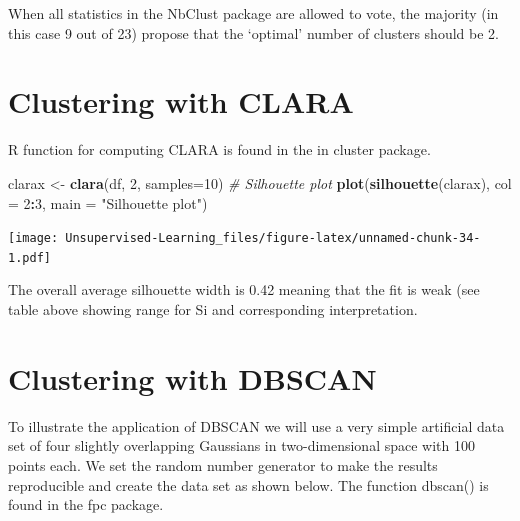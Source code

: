 \documentclass[
]{book}
\newenvironment{Shaded}{\begin{snugshade}}{\end{snugshade}}
\newcommand{\CommentTok}[1]{\textcolor[rgb]{0.56,0.35,0.01}{\textit{#1}}}
\newcommand{\DataTypeTok}[1]{\textcolor[rgb]{0.13,0.29,0.53}{#1}}
\newcommand{\DecValTok}[1]{\textcolor[rgb]{0.00,0.00,0.81}{#1}}
\newcommand{\KeywordTok}[1]{\textcolor[rgb]{0.13,0.29,0.53}{\textbf{#1}}}
\newcommand{\NormalTok}[1]{#1}
\newcommand{\OperatorTok}[1]{\textcolor[rgb]{0.81,0.36,0.00}{\textbf{#1}}}
\newcommand{\StringTok}[1]{\textcolor[rgb]{0.31,0.60,0.02}{#1}}
\begin{document}
When all statistics in the NbClust package are allowed to vote, the majority (in this case 9 out of 23) propose
that the `optimal' number of clusters should be 2.

\hypertarget{clustering-with-clara}{%
\section{Clustering with CLARA}\label{clustering-with-clara}}

R function for computing CLARA is found in the in cluster package.

\begin{Shaded}
\begin{Highlighting}[]
\NormalTok{clarax <-}\StringTok{ }\KeywordTok{clara}\NormalTok{(df, }\DecValTok{2}\NormalTok{, }\DataTypeTok{samples=}\DecValTok{10}\NormalTok{)}
\CommentTok{# Silhouette plot}
\KeywordTok{plot}\NormalTok{(}\KeywordTok{silhouette}\NormalTok{(clarax), }\DataTypeTok{col =} \DecValTok{2}\OperatorTok{:}\DecValTok{3}\NormalTok{, }\DataTypeTok{main =} \StringTok{"Silhouette plot"}\NormalTok{)}
\end{Highlighting}
\end{Shaded}

\texttt{[image: Unsupervised-Learning\_files/figure-latex/unnamed-chunk-34-1.pdf]}

The overall average silhouette width is 0.42 meaning that the fit is weak (see table above showing range for Si and corresponding interpretation.

\hypertarget{clustering-with-dbscan}{%
\section{Clustering with DBSCAN}\label{clustering-with-dbscan}}

To illustrate the application of DBSCAN we will use a very simple artificial data set of four slightly overlapping
Gaussians in two-dimensional space with 100 points each. We set the random number generator to make
the results reproducible and create the data set as shown below. The function dbscan() is found in the fpc
package.
\end{document}
